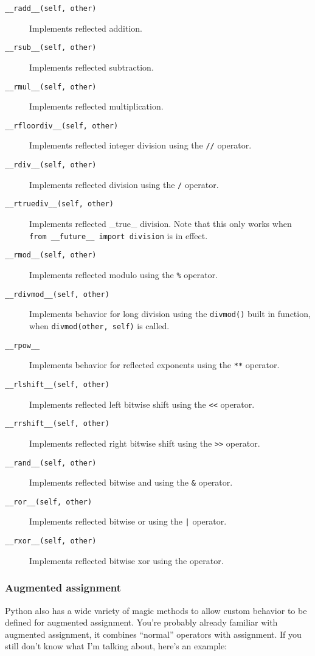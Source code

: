 \documentclass[a4paper,11pt]{article}
\newcommand{\code}[1]{\texttt{#1}}
\begin{document}
\begin{description}

\item[\code{__radd__(self, other)}]
Implements reflected addition.
\item[\code{__rsub__(self, other)}]
Implements reflected subtraction.
\item[\code{__rmul__(self, other)}]
Implements reflected multiplication.
\item[\code{__rfloordiv__(self, other)}]
Implements reflected integer division using the \code{//} operator.
\item[\code{__rdiv__(self, other)}]
Implements reflected division using the \code{/} operator.
\item[\code{__rtruediv__(self, other)}]
Implements reflected _true_ division. Note that this only works when \code{from __future__ import division} is in effect.
\item[\code{__rmod__(self, other)}]
Implements reflected modulo using the \code{\%} operator.
\item[\code{__rdivmod__(self, other)}]
Implements behavior for long division using the \code{divmod()} built in function, when \code{divmod(other, self)} is called.
\item[\code{__rpow__}]
Implements behavior for reflected exponents using the \code{**} operator.
\item[\code{__rlshift__(self, other)}]
Implements reflected left bitwise shift using the \code{<<} operator.
\item[\code{__rrshift__(self, other)}]
Implements reflected right bitwise shift using the \code{>>} operator.
\item[\code{__rand__(self, other)}]
Implements reflected bitwise and using the \code{\&} operator.
\item[\code{__ror__(self, other)}]
Implements reflected bitwise or using the \code{|} operator.
\item[\code{__rxor__(self, other)}]
Implements reflected bitwise xor using the \code{} operator.

\end{description}

\subsubsection{Augmented assignment}

Python also has a wide variety of magic methods to allow custom behavior to be defined for augmented assignment. You're probably already familiar with augmented assignment, it combines ``normal'' operators with assignment. If you still don't know what I'm talking about, here's an example:
\end{document}

